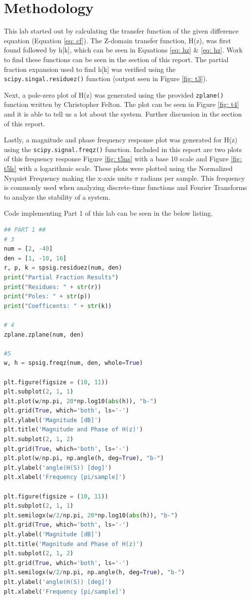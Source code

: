 \documentclass[12pt]{report}
\begin{document}
\section{Methodology}

This lab started out by calculating the transfer function of the given difference equation (Equation \eqref{eq: cf}). The
Z-domain transfer function, H(z), was first found followed by h[k], which can be seen in Equations \eqref{eq: hz} \& \eqref{eq: hz}.
Work to find these functions can be seen in the  section of this report. The partial fraction expansion
used to find h[k] was verified using the \texttt{scipy.singal.residuez()} function (output seen in Figure \ref{fig: t3}). 

Next, a pole-zero plot of H(z) was generated using the provided \texttt{zplane()} function written by Christopher Felton.
The plot can be seen in Figure \ref{fig: t4} and it is able to tell us a lot about the system. Further discussion in 
the  section of this report.

Lastly, a magnitude and phase frequency response plot was generated for H(z) using the \texttt{scipy.signal.freqz()} function.
Included in this report are two plots of this frequency response Figure \ref{fig: t5ns} with a base 10 scale and Figure \ref{fig: t5ls}
with a logarithmic scale. These plots were plotted using the Normalized Nyquist Frequency making the x-axis units $\pi$ radians per sample.
This frequency is commonly used when analyzing discrete-time functions and Fourier Transforms to analyze the stability of a system.

Code implementing Part 1 of this lab can be seen in the below listing.

\begin{lstlisting}[language=Python, basicstyle=\footnotesize]
## PART 1 ##
# 3
num = [2, -40]
den = [1, -10, 16]
r, p, k = spsig.residuez(num, den)
print("Partial Fraction Results")
print("Residues: " + str(r))
print("Poles: " + str(p))
print("Coefficents: " + str(k))

# 4
zplane.zplane(num, den)

#5
w, h = spsig.freqz(num, den, whole=True)

plt.figure(figsize = (10, 11))
plt.subplot(2, 1, 1)
plt.plot(w/np.pi, 20*np.log10(abs(h)), "b-")
plt.grid(True, which='both', ls='-')
plt.ylabel('Magnitude [dB]')
plt.title('Magnitude and Phase of H(z)')
plt.subplot(2, 1, 2)
plt.grid(True, which='both', ls='-')
plt.plot(w/np.pi, np.angle(h, deg=True), "b-")
plt.ylabel('angle(H(S)) [deg]')
plt.xlabel('Frequency [pi/sample]')

plt.figure(figsize = (10, 11))
plt.subplot(2, 1, 1)
plt.semilogx(w/2/np.pi, 20*np.log10(abs(h)), "b-")
plt.grid(True, which='both', ls='-')
plt.ylabel('Magnitude [dB]')
plt.title('Magnitude and Phase of H(z)')
plt.subplot(2, 1, 2)
plt.grid(True, which='both', ls='-')
plt.semilogx(w/2/np.pi, np.angle(h, deg=True), "b-")
plt.ylabel('angle(H(S)) [deg]')
plt.xlabel('Frequency [pi/sample]')
\end{lstlisting}
\end{document}
